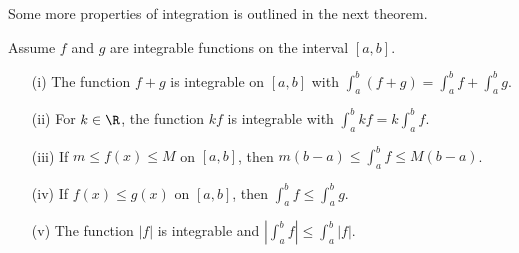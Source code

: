 Some more properties of integration is outlined in the next theorem.

\begin{tcolorbox}
\begin{thm}
	Assume \( f  \) and \( g  \)  are integrable functions on the interval \( [a,b]  \).
	\begin{enumerate}
		\item[(i)] The function \( f + g  \) is integrable on \( [a,b]  \) with \( \int_{ a }^{ b } (f + g) = \int_{ a }^{ b }  f + \int_{ a }^{ b } g  \).
		\item[(ii)] For \( k \in \R  \), the function \( kf  \) is integrable with \( \int_{ a }^{ b } kf  = k \int_{ a }^{ b }  f. \)
		\item[(iii)] If \( m \leq f(x) \leq M  \) on \( [a,b]  \), then \( m(b-a) \leq \int_{ a }^{ b } f \leq M(b-a) \).
		\item[(iv)] If \( f(x) \leq g(x)  \) on \( [a,b]  \), then \( \int_{ a }^{ b } f  \leq \int_{ a }^{ b } g  \).
		\item[(v)] The function \( | f |   \) is integrable and \( | \int_{ a }^{ b }  f | \leq \int_{ a }^{ b } | f |. \) 
	\end{enumerate}
\end{thm}
\end{tcolorbox}

